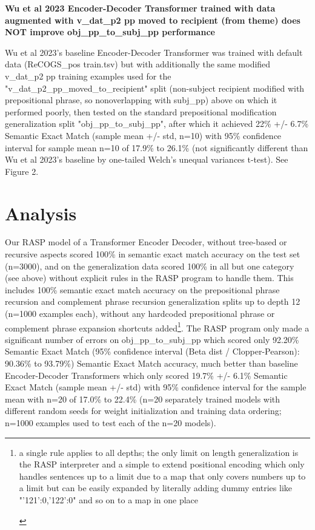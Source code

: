 \documentclass[11pt]{article}
\begin{document}

\textbf{Wu et al 2023 Encoder-Decoder Transformer trained with data augmented with v\_dat\_p2 pp moved to recipient (from theme) does NOT improve obj\_pp\_to\_subj\_pp performance}

Wu et al 2023's baseline Encoder-Decoder Transformer was trained with default data (ReCOGS\_pos train.tsv) but with additionally the same modified v\_dat\_p2 pp training examples used for the "v\_dat\_p2\_pp\_moved\_to\_recipient" split (non-subject recipient modified with prepositional phrase, so nonoverlapping with subj\_pp) above on which it performed poorly, then tested on the standard prepositional modification generalization split "obj\_pp\_to\_subj\_pp", after which it achieved 22\% +/- 6.7\% Semantic Exact Match (sample mean +/- std, n=10) with 95\% confidence interval for sample mean n=10 of 17.9\% to 26.1\% (not significantly different than Wu et al 2023's baseline by one-tailed Welch's unequal variances t-test). See Figure 2.

\section{Analysis} 
Our RASP model of a Transformer Encoder Decoder, without tree-based or recursive aspects scored 100\% in semantic exact match accuracy on the \cite{Wu2023} test set (n=3000), and on the generalization data scored 100\% in all but one category (see above) without explicit rules in the RASP program to handle them. This includes 100\% semantic exact match accuracy on the prepositional phrase recursion and complement phrase recursion generalization splits up to depth 12 (n=1000 examples each), without any hardcoded prepositional phrase or complement phrase expansion shortcuts added\footnote{
\begin{tiny}
a single rule applies to all depths; the only limit on length generalization is the RASP interpreter and a simple to extend positional encoding which only handles sentences up to a limit due to a map that only covers numbers up to a limit but can be easily expanded by literally adding dummy entries like "'121':0,'122':0" and so on to a map in one place
\end{tiny}
}. The RASP program only made a significant number of errors on obj\_pp\_to\_subj\_pp which scored only 92.20\% Semantic Exact Match (95\% confidence interval (Beta dist / Clopper-Pearson): 90.36\% to 93.79\%) Semantic Exact Match accuracy, much better than \cite{Wu2023} baseline Encoder-Decoder Transformers which only scored 19.7\% +/- 6.1\% Semantic Exact Match (sample mean +/- std) with 95\% confidence interval for the sample mean with n=20 of 17.0\% to 22.4\% (n=20 separately trained models with different random seeds for weight initialization and training data ordering; n=1000 examples used to test each of the n=20 models).
\end{document}
